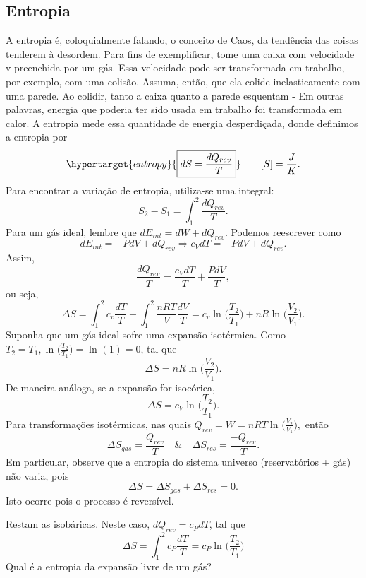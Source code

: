 \documentclass{article}
\begin{document}
\subsection{Entropia}
  A entropia é, coloquialmente falando, o conceito de Caos, da tendência das coisas tenderem à desordem.
Para fins de exemplificar, tome uma caixa com velocidade v preenchida por um gás. Essa velocidade pode ser transformada
em trabalho, por exemplo, com uma colisão. Assuma, então, que ela colide inelasticamente com uma parede. Ao colidir, tanto a 
caixa quanto a parede esquentam - Em outras palavras, energia que poderia ter sido usada em trabalho foi transformada em calor.
A entropia mede essa quantidade de energia desperdiçada, donde definimos a entropia por 
  \[
    \hypertarget{entropy}{\boxed{dS = \frac{dQ_{rev}}{T}}}\quad\quad [S] = \frac{J}{K}.
  \]
  Para encontrar a variação de entropia, utiliza-se uma integral:
  \[
    S_{2}-S_{1} = \int_{1}^{2}\frac{dQ_{rev}}{T}.
  \]
  Para um gás ideal, lembre que \(dE_{int} = dW + dQ_{rev}\). Podemos reescrever como 
  \[
    dE_{int} = -PdV + dQ_{rev}\Rightarrow c_{V}dT = -PdV + dQ_{rev}.
  \]
  Assim, 
  \[
    \frac{dQ_{rev}}{T} = \frac{c_{V}dT}{T}+\frac{PdV}{T},
  \]
ou seja, 
  \[
    \Delta S = \int_{1}^{2} c_{v}\frac{dT}{T} + \int_{1}^{2} \frac{nRT}{V}\frac{dV}{T} = c_{v}\ln^{}{\biggl(\frac{T_{2}}{T_{1}}\biggr)} + nR\ln^{}{\biggl(\frac{V_{2}}{V_{1}}\biggr)}.
  \]
  Suponha que um gás ideal sofre uma expansão isotérmica. Como \(T_{2} = T_{1}, \ln^{}{\biggl(\frac{T_{2}}{T_{1}}\biggr)} = \ln^{}{(1)}=0\),
tal que 
  \[
    \Delta S = nR\ln^{}{\biggl(\frac{V_{2}}{V_{1}}\biggr)}.
  \]
  De maneira análoga, se a expansão for isocórica, 
  \[
    \Delta S = c_{V}\ln^{}{\biggl(\frac{T_{2}}{T_{1}}\biggr)}.
  \]
  Para transformações isotérmicas, nas quais \(Q_{rev} = W = nRT\ln^{}{\biggl(\frac{V_{2}}{V_{1}}\biggr)},\) então 
  \[
    \Delta S_{gas} = \frac{Q_{rev}}{T}\quad\&\quad \Delta S_{res} = \frac{-Q_{rev}}{T}.
  \]
  Em particular, observe que a entropia do sistema universo (reservatórios + gás) não varia, pois 
  \[
    \Delta S = \Delta S_{gas} + \Delta S_{res} = 0.
  \]
  Isto ocorre pois o processo é reversível.

  Restam as isobáricas. Neste caso, \(dQ_{rev} = c_{P}dT\), tal que 
  \[
    \Delta S = \int_{1}^{2} c_{P}\frac{dT}{T} = c_{P}\ln^{}{\biggl(\frac{T_{2}}{T_{1}}\biggr)}
  \]
  Qual é a entropia da expansão livre de um gás?
\end{document}
